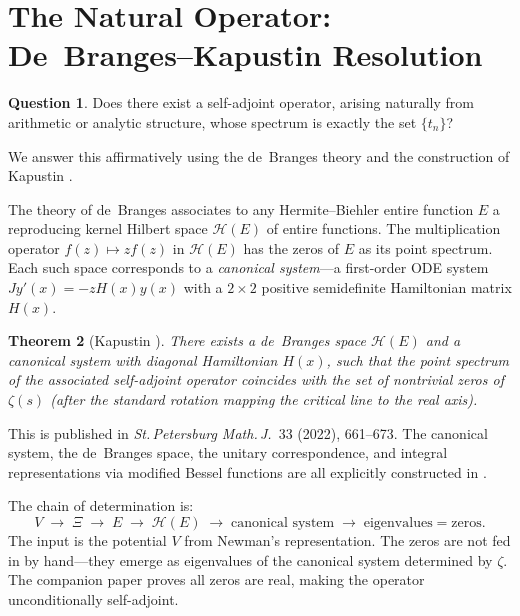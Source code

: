 \documentclass[11pt,a4paper]{amsart}
\newtheorem{theorem}{Theorem}[section]
\theoremstyle{definition}
\newtheorem{question}[theorem]{Question}
\theoremstyle{remark}
\begin{document}
\section{The Natural Operator: De~Branges--Kapustin Resolution}\label{sec:natural}

\begin{question}\label{q:natural}
Does there exist a self-adjoint operator, arising naturally from arithmetic or analytic structure, whose spectrum is exactly the set $\{t_n\}$?
\end{question}

We answer this affirmatively using the de~Branges theory \cite{dB68} and the construction of Kapustin \cite{Kap22a,Kap22b}.

The theory of de~Branges associates to any Hermite--Biehler entire function $E$ a reproducing kernel Hilbert space $\mathcal{H}(E)$ of entire functions. The multiplication operator $f(z)\mapsto zf(z)$ in $\mathcal{H}(E)$ has the zeros of $E$ as its point spectrum. Each such space corresponds to a \emph{canonical system}---a first-order ODE system $Jy'(x) = -zH(x)y(x)$ with a $2\times 2$ positive semidefinite Hamiltonian matrix $H(x)$.

\begin{theorem}[Kapustin {\cite{Kap22a}}]\label{thm:kapustin}
There exists a de~Branges space $\mathcal{H}(E)$ and a canonical system with \emph{diagonal} Hamiltonian $H(x)$, such that the point spectrum of the associated self-adjoint operator coincides with the set of nontrivial zeros of $\zeta(s)$ (after the standard rotation mapping the critical line to the real axis).
\end{theorem}

This is published in \emph{St.\,Petersburg Math.\,J.}~33 (2022), 661--673. The canonical system, the de~Branges space, the unitary correspondence, and integral representations via modified Bessel functions are all explicitly constructed in \cite{Kap22a,Kap22b}.

The chain of determination is:
\[
V \;\longrightarrow\; \Xi \;\longrightarrow\; E \;\longrightarrow\; \mathcal{H}(E) \;\longrightarrow\; \text{canonical system} \;\longrightarrow\; \text{eigenvalues} = \text{zeros}.
\]
The input is the potential $V$ from Newman's representation. The zeros are not fed in by hand---they emerge as eigenvalues of the canonical system determined by $\zeta$. The companion paper \cite{Shr26c} proves all zeros are real, making the operator unconditionally self-adjoint.
\end{document}
